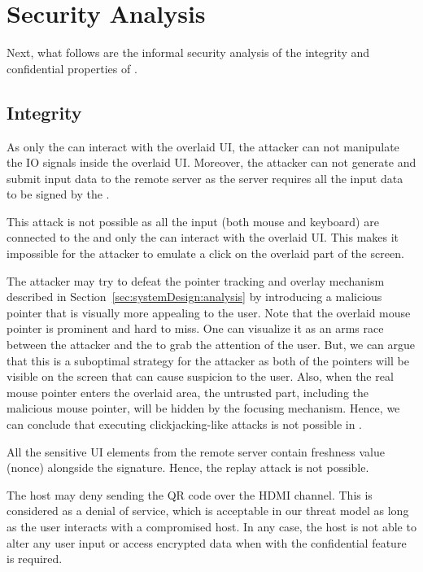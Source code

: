 \section{Security Analysis}
\label{sec:securityAnalysis}


Next, what follows are the informal security analysis of the integrity and confidential properties of \name. 


\subsection{Integrity}
\label{sec:securityAnalysis:integrity}



 As only the \device can interact with the overlaid UI, the attacker can not manipulate the IO signals inside the overlaid UI. Moreover, the attacker can not generate and submit input data to the remote server as the server requires all the input data to be signed by the \device.

 This attack is not possible as all the input (both mouse and keyboard) are connected to the \device and only the \device can interact with the overlaid UI. This makes it impossible for the attacker to emulate a click on the overlaid part of the screen.  

The attacker may try to defeat the \name pointer tracking and overlay mechanism described in Section~\ref{sec:systemDesign:analysis} by introducing a malicious pointer that is visually more appealing to the user. Note that the \device overlaid mouse pointer is prominent and hard to miss. One can visualize it as an arms race between the attacker and the \device to grab the attention of the user. But, we can argue that this is a suboptimal strategy for the attacker as both of the pointers will be visible on the screen that can cause suspicion to the user. Also, when the real mouse pointer enters the overlaid area, the untrusted part, including the malicious mouse pointer, will be hidden by the focusing mechanism. Hence, we can conclude that executing clickjacking-like attacks is not possible in \name.



 All the sensitive UI elements from the remote server contain freshness value (nonce) alongside the signature. Hence, the replay attack is not possible.

 The host may deny sending the QR code over the HDMI channel. This is considered as a denial of service, which is acceptable in our threat model as long as the user interacts with a compromised host. 
In any case, the host is not able to alter any user input or access encrypted data when \name with the confidential feature is required.

